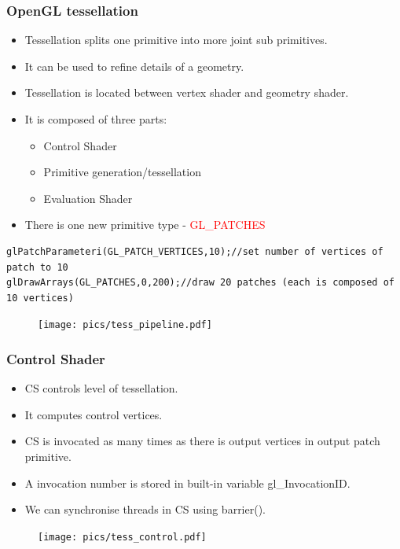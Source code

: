 
\begin{frame}[fragile]
\frametitle{OpenGL tessellation}
	\begin{itemize}
	\item Tessellation splits one primitive into more joint sub primitives.
	\item It can be used to refine details of a geometry.
	\item Tessellation is located between vertex shader and geometry shader.
	\item It is composed of three parts:
	\begin{itemize}
	\item Control Shader
	\item Primitive generation/tessellation
	\item Evaluation Shader
	\end{itemize}
	\item There is one new primitive type - \textcolor{red}{GL\_PATCHES}
	\end{itemize}
{\scriptsize
\begin{verbatim}
glPatchParameteri(GL_PATCH_VERTICES,10);//set number of vertices of patch to 10
glDrawArrays(GL_PATCHES,0,200);//draw 20 patches (each is composed of 10 vertices)
\end{verbatim}
}
	\begin{figure}[h]
	\texttt{[image: pics/tess\_pipeline.pdf]}
	\end{figure}
\end{frame}

\begin{frame}
\frametitle{Control Shader}
	\begin{itemize}
	\item CS controls level of tessellation.
	\item It computes control vertices.
	\item CS is invocated as many times as there is output vertices in output patch primitive.
	\item A invocation number is stored in built-in variable \textcolor{OliveGreen}{gl\_InvocationID}.
	\item We can synchronise threads in CS using \textcolor{OliveGreen}{barrier}().
	\end{itemize}
	\begin{figure}[h]
	\texttt{[image: pics/tess\_control.pdf]}
	\end{figure}
\end{frame}

